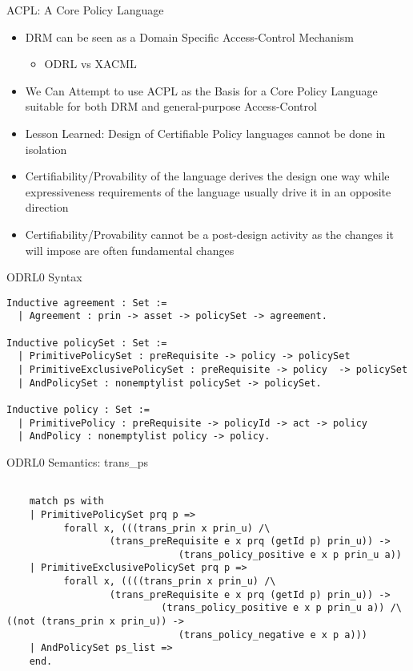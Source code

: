 \documentclass{beamer}
\begin{document}
\begin{frame}[fragile]{ACPL: A Core Policy Language}
\small
\begin{itemize}
\item DRM can be seen as a Domain Specific Access-Control Mechanism
    \begin{itemize}
       \item ODRL vs XACML
   \end{itemize}
\item We Can Attempt to use ACPL as the Basis for a Core Policy Language suitable for both DRM and general-purpose Access-Control
\item Lesson Learned: Design of Certifiable Policy languages cannot be done in isolation
\item Certifiability/Provability of the language derives the design one way while expressiveness requirements of the language usually drive it in an opposite direction
\item Certifiability/Provability cannot be a post-design activity as the changes it will impose are often fundamental changes
\end{itemize}
\end{frame}
\begin{frame}[fragile]{ODRL0 Syntax}
\lstset{language=Coq}
\begin{lstlisting}
Inductive agreement : Set :=
  | Agreement : prin -> asset -> policySet -> agreement.

Inductive policySet : Set :=
  | PrimitivePolicySet : preRequisite -> policy -> policySet 
  | PrimitiveExclusivePolicySet : preRequisite -> policy  -> policySet 
  | AndPolicySet : nonemptylist policySet -> policySet.

Inductive policy : Set :=
  | PrimitivePolicy : preRequisite -> policyId -> act -> policy 
  | AndPolicy : nonemptylist policy -> policy.

\end{lstlisting}
\end{frame}
\begin{frame}[fragile]{ODRL0 Semantics: trans\_ps}
\lstset{language=Coq}
\begin{lstlisting}

    match ps with
    | PrimitivePolicySet prq p => 
          forall x, (((trans_prin x prin_u) /\ 
                  (trans_preRequisite e x prq (getId p) prin_u)) -> 
                              (trans_policy_positive e x p prin_u a))  
    | PrimitiveExclusivePolicySet prq p => 
          forall x, ((((trans_prin x prin_u) /\ 
                  (trans_preRequisite e x prq (getId p) prin_u)) -> 
                           (trans_policy_positive e x p prin_u a)) /\ ((not (trans_prin x prin_u)) -> 
                              (trans_policy_negative e x p a)))                  
    | AndPolicySet ps_list => 
    end.
\end{lstlisting}
\end{frame}
\end{document}
